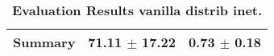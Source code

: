 \begin{table}[htb]
{\begin{tabular}{lll}
\midrule
\textbf{Summary                                  } &                  \phantom{0}71.11 $\pm$ 17.22 &             \phantom{0}0.73 $\pm$ \phantom{0}0.18 \\
\bottomrule
\end{tabular}%
}
\caption{\textbf{Evaluation Results vanilla distrib inet.}}
\label{tab:eval-results}
\end{table}
